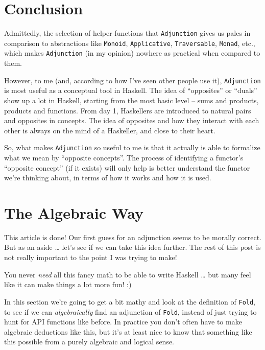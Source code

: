 \documentclass[]{article}
\begin{document}
\hypertarget{conclusion}{%
\section{Conclusion}\label{conclusion}}

Admittedly, the selection of helper functions that \texttt{Adjunction} gives us
pales in comparison to abstractions like \texttt{Monoid}, \texttt{Applicative},
\texttt{Traversable}, \texttt{Monad}, etc., which makes \texttt{Adjunction} (in
my opinion) nowhere as practical when compared to them.

However, to me (and, according to how I've seen other people use it),
\texttt{Adjunction} is most useful as a conceptual tool in Haskell. The idea of
``opposites'' or ``duals'' show up a lot in Haskell, starting from the most
basic level -- sums and products, products and functions. From day 1, Haskellers
are introduced to natural pairs and opposites in concepts. The idea of opposites
and how they interact with each other is always on the mind of a Haskeller, and
close to their heart.

So, what makes \texttt{Adjunction} so useful to me is that it actually is able
to formalize what we mean by ``opposite concepts''. The process of identifying a
functor's ``opposite concept'' (if it exists) will only help is better
understand the functor we're thinking about, in terms of how it works and how it
is used.

\hypertarget{the-algebraic-way}{%
\section{The Algebraic Way}\label{the-algebraic-way}}

This article is done! Our first guess for an adjunction seems to be morally
correct. But as an aside \ldots{} let's see if we can take this idea further.
The rest of this post is not really important to the point I was trying to make!

You never \emph{need} all this fancy math to be able to write Haskell \ldots{}
but many feel like it can make things a lot more fun! :)

In this section we're going to get a bit mathy and look at the definition of
\texttt{Fold}, to see if we can \emph{algebraically} find an adjunction of
\texttt{Fold}, instead of just trying to hunt for API functions like before. In
practice you don't often have to make algebraic deductions like this, but it's
at least nice to know that something like this possible from a purely algebraic
and logical sense.
\end{document}
